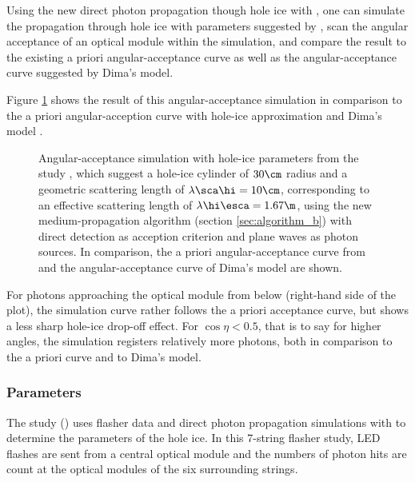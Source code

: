 Using the new direct photon propagation though hole ice with \clsim, one can simulate the propagation through hole ice with parameters suggested by , scan the angular acceptance of an optical module within the simulation, and compare the result to the existing a priori angular-acceptance curve as well as the angular-acceptance curve suggested by Dima's model.


Figure \ref{fig:eePai1sh} shows the result of this angular-acceptance simulation in comparison to the a priori angular-acception curve with hole-ice approximation \cite{icepaper} and Dima's model \cite{flasherdataderivedicemodels}.

\begin{figure}[htbp]
  \caption{Angular-acceptance simulation with hole-ice parameters from the  study \cite{martindardupdate}, which suggest a hole-ice cylinder of $30\cm$ radius and a geometric scattering length of $\lambda\sca\hi = 10\cm$, corresponding to an effective scattering length of $\lambda\hi\esca = 1.67\m$, using the new medium-propagation algorithm (section \ref{sec:algorithm_b}) with direct detection as acception criterion and plane waves as photon sources. In comparison, the a priori angular-acceptance curve from \cite{icepaper} and the angular-acceptance curve of Dima's model \cite{flasherdataderivedicemodels} are shown.}
  \label{fig:eePai1sh}
\end{figure}

For photons approaching the optical module from below (right-hand side of the plot), the simulation curve rather follows the a priori acceptance curve, but shows a less sharp hole-ice drop-off effect. For $\cos\eta < 0.5$, that is to say for higher angles, the simulation registers relatively more photons, both in comparison to the a priori curve and to Dima's model.


\subsubsection{ Parameters}
\label{sec:spicehd_parameters}

The  study () uses flasher data and direct photon propagation simulations with \ppc to determine the parameters of the hole ice. In this 7-string flasher study, LED flashes are sent from a central optical module and the numbers of photon hits are count at the optical modules of the six surrounding strings.

